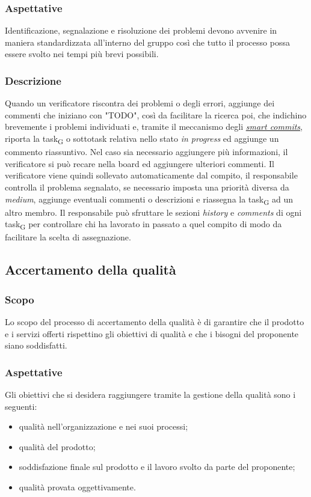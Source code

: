     \subsubsection{Aspettative}
        Identificazione, segnalazione e risoluzione dei problemi devono avvenire in maniera standardizzata all'interno del gruppo così che tutto il processo possa essere svolto nei tempi più brevi possibili.
    \subsubsection{Descrizione}
        Quando un verificatore riscontra dei problemi o degli errori, aggiunge dei commenti che iniziano con "TODO", così da facilitare la ricerca poi, che indichino brevemente i problemi individuati e, tramite il meccanismo degli \hyperref[jiraintegration]{\textit{smart commits}}, riporta la task\textsubscript{G} o sottotask relativa nello stato \textit{in progress} ed aggiunge un commento riassuntivo. Nel caso sia necessario aggiungere più informazioni, il verificatore si può recare nella board ed aggiungere ulteriori commenti. Il verificatore viene quindi sollevato automaticamente dal compito, il responsabile controlla il problema segnalato, se necessario imposta una priorità diversa da \textit{medium}, aggiunge eventuali commenti o descrizioni e riassegna la task\textsubscript{G} ad un altro membro. Il responsabile può sfruttare le sezioni \textit{history} e \textit{comments} di ogni task\textsubscript{G} per controllare chi ha lavorato in passato a quel compito di modo da facilitare la scelta di assegnazione.

\subsection{Accertamento della qualità}
    \subsubsection{Scopo}
    Lo scopo del processo di accertamento della qualità è di garantire che il prodotto e i servizi offerti rispettino gli obiettivi di qualità e che i bisogni del proponente siano soddisfatti.
    \subsubsection{Aspettative}
    Gli obiettivi che si desidera raggiungere tramite la gestione della qualità sono i seguenti:
    \begin{itemize}
    	\item qualità nell'organizzazione e nei suoi processi;
    	\item qualità del prodotto;
    	\item soddisfazione finale sul prodotto e il lavoro svolto da parte del proponente;
    	\item qualità provata oggettivamente.
    \end{itemize}
